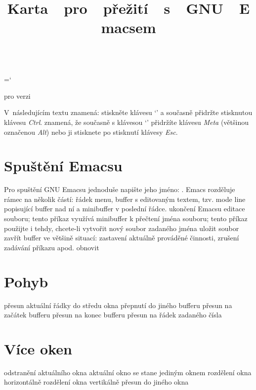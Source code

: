 \chardef\\=`\\

\raggedright
\nopagenumbers
\parindent 0pt
\hoffset -0.2in



\title{Karta\ \ pro\ \ přežití\ \ s\ \ GNU\ \ Emacsem}{pro verzi \versionemacs}

V~následujícím textu  znamená: stiskněte klávesu `' a
současně přidržte stisknutou klávesu {\it Ctrl}.  znamená, že
současně s klávesou `' přidržíte klávesu {\it Meta\/} (většinou
označenou {\it Alt\/}) nebo ji stisknete po stisknutí klávesy {\it Esc\/}.


\section{Spuštění Emacsu}

Pro spuštění GNU Emacsu jednoduše napište jeho jméno: .
Emacs rozděluje rámec na několik částí:
  řádek menu,
  buffer s editovaným textem,
  tzv. mode line popisující buffer nad ní
  a minibuffer v poslední řádce.
\askip
{} ukončení Emacsu
 editace souboru; tento příkaz využívá minibuffer k přečtení
              jména souboru; tento příkaz použijte i tehdy, chcete-li
              vytvořit nový soubor zadaného jména
 uložit soubor
 zavřít buffer
 ve většině situací: zastavení aktuálně prováděné činnosti,
              zrušení zadávání příkazu apod.
 obnovit

\section{Pohyb}

 přesun aktuální řádky do středu okna
 přepnutí do jiného bufferu
 přesun na začátek bufferu
 přesun na konec bufferu
 přesun na řádek zadaného čísla

\section{Více oken}

 odstranění aktuálního okna
 aktuální okno se stane jediným oknem
 rozdělení okna horizontálně
 rozdělení okna vertikálně
 přesun do jiného okna

